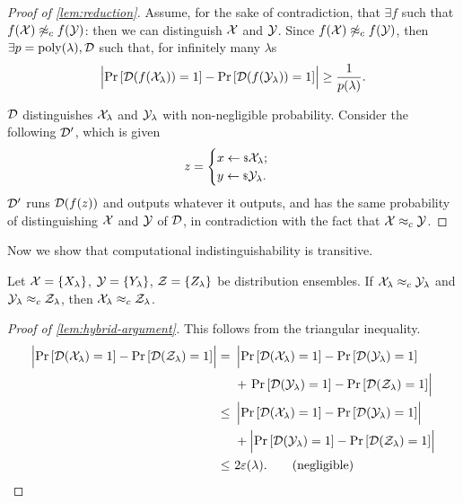 \begin{proof}[Proof of \cref{lem:reduction}]
	Assume, for the sake of contradiction, that $\exists f$ such that $f(\mathcal{X}) \not \approx_c f(\mathcal{Y})$: then we can distinguish $\mathcal{X}$ and $\mathcal{Y}$.
	Since $f(\mathcal{X}) \not \approx_c f(\mathcal{Y})$, then $\exists p = \mathrm{poly}(\lambda), \mathcal{D}$ such that, for infinitely many $\lambda$s
	\begin{equation*}
		\left|{\mathop{\mathrm{Pr}}\limits_{} \left[ {\mathcal{D}(f(\mathcal{X}_{\lambda})) = 1} \right] - \mathop{\mathrm{Pr}}\limits_{} \left[ {\mathcal{D}(f(\mathcal{Y}_{\lambda})) = 1} \right]}\right| \ge \frac{1}{p(\lambda)}.
	\end{equation*}

	$\mathcal{D}$ distinguishes $\mathcal{X}_{\lambda}$ and $\mathcal{Y}_{\lambda}$ with non-negligible probability.
	Consider the following $\mathcal{D}'$, which is given
	\begin{equation*}
		z =
		\begin{cases}
			x \leftarrow {\scriptstyle \$} {\mathcal{X}_{\lambda}}; \\
			y \leftarrow {\scriptstyle \$} {\mathcal{Y}_{\lambda}}. \\
		\end{cases}
	\end{equation*}
	$\mathcal{D}'$ runs $\mathcal{D}(f(z))$ and outputs whatever it outputs, and has the same probability of distinguishing $\mathcal{X}$ and $\mathcal{Y}$ of $\mathcal{D}$, in contradiction with the fact that $\mathcal{X} \approx_c \mathcal{Y}$.
\end{proof}

Now we show that computational indistinguishability is transitive.

\begin{lemma} \label{lem:hybrid-argument}
	Let $\mathcal{X} = \{X_{\lambda}\}$, $\mathcal{Y} = \{ Y_{\lambda} \}$, $\mathcal{Z} = \{ Z_{\lambda} \}$ be distribution ensembles.
	If $\mathcal{X}_{\lambda} \approx_c \mathcal{Y}_{\lambda}$ and $\mathcal{Y}_{\lambda} \approx_c \mathcal{Z}_{\lambda}$, then $\mathcal{X}_{\lambda} \approx_c \mathcal{Z}_{\lambda}$.
\end{lemma}

\begin{proof}[Proof of \cref{lem:hybrid-argument}]
	This follows from the triangular inequality.
	\begin{align*}
		\left|{\mathop{\mathrm{Pr}}\limits_{} \left[ {\mathcal{D}(\mathcal{X}_{\lambda}) = 1} \right] - \mathop{\mathrm{Pr}}\limits_{} \left[ {\mathcal{D}(\mathcal{Z}_{\lambda}) = 1} \right]}\right|
		= &~
		\left| \mathop{\mathrm{Pr}}\limits_{} \left[ {\mathcal{D}(\mathcal{X}_{\lambda}) = 1} \right] - \mathop{\mathrm{Pr}}\limits_{} \left[ {\mathcal{D}(\mathcal{Y}_{\lambda}) = 1} \right] \right.
		\\
		&~+
		\left. \mathop{\mathrm{Pr}}\limits_{} \left[ {\mathcal{D}(\mathcal{Y}_{\lambda}) = 1} \right] - \mathop{\mathrm{Pr}}\limits_{} \left[ {\mathcal{D}(\mathcal{Z}_{\lambda}) = 1} \right] \right|
		\\
		\le &~
		\left|{\mathop{\mathrm{Pr}}\limits_{} \left[ {\mathcal{D}(\mathcal{X}_{\lambda}) = 1} \right] - \mathop{\mathrm{Pr}}\limits_{} \left[ {\mathcal{D}(\mathcal{Y}_{\lambda}) = 1} \right]}\right|
		\\
		&~+
		\left|{\mathop{\mathrm{Pr}}\limits_{} \left[ {\mathcal{D}(\mathcal{Y}_{\lambda}) = 1} \right] - \mathop{\mathrm{Pr}}\limits_{} \left[ {\mathcal{D}(\mathcal{Z}_{\lambda}) = 1} \right]}\right|
		\\
		\le &~2 \varepsilon(\lambda). \tag{negligible}
	\end{align*}
\end{proof}


